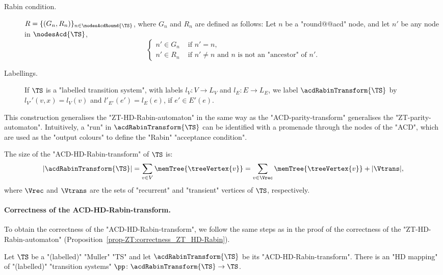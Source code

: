 \documentclass[10pt,a4paper]{amsart}
\begin{document}
\begin{definition}
\begin{description}
		\item[Rabin condition.] $R = \{(G_n, R_n)\}_{n\in \nodesAcdRound{\TS}}$, where $G_n$ and $R_n$ are defined as follows: Let $n$ be a "round@@acd" node, and let $n'$ be any node in $\nodesAcd{\TS}$,
		\begin{equation*}
			\begin{cases}
				n' \in G_n & \text{ if } n'=n,\\
				n' \in R_n & \text{ if }  n'\neq n \text{ and } n \text{ is not an "ancestor" of } n'. 
			\end{cases}
		\end{equation*} 	
		
		\item[Labellings.] If $\TS$ is a "labelled transition system", with labels $l_V\colon V \to L_V$ and $l_E\colon E \to L_E$, we label $\acdRabinTransform{\TS}$ by $l_{V'}'(v,x) = l_V(v)$ and $l'_{E'}(e') = l_E(e)$, if $e'\in E'(e)$.
	\end{description}
\end{definition}

This construction generalises the "ZT-HD-Rabin-automaton" in the same way as the "ACD-parity-transform" generalises the "ZT-parity-automaton". Intuitively, a "run" in $\acdRabinTransform{\TS}$ can be identified with a promenade through the nodes of the "ACD", which are used as the "output colours" to define the "Rabin" "acceptance condition".

\begin{remark}\label{rmk-acd:size_acd-RabinHD-transformation}
	The size of the "ACD-HD-Rabin-transform" of $\TS$ is:
	\[|\acdRabinTransform{\TS}| = \sum_{v\in V} \memTree{\treeVertex{v}} = \sum_{v\in \Vrec}\memTree{\treeVertex{v}} + |\Vtrans|,\]
	where $\Vrec$ and $\Vtrans$ are the sets of "recurrent" and "transient" vertices of $\TS$, respectively.
\end{remark}


\paragraph*{Correctness of the ACD-HD-Rabin-transform.} To obtain the correctness of the "ACD-HD-Rabin-transform", we follow the same steps as in the proof of the correctness of the "ZT-HD-Rabin-automaton" (Proposition~\ref{prop-ZT:correctness_ZT_HD-Rabin}).

\begin{proposition}\label{prop-ACD:correctness_ACD-HD-Rabin-transform}
	Let $\TS$ be a "(labelled)" "Muller" "TS" and let $\acdRabinTransform{\TS}$ be its "ACD-HD-Rabin-transform". There is an "HD mapping" of "(labelled)" "transition systems" $\pp\colon \acdRabinTransform{\TS} \to \TS$.
\end{proposition}
\end{document}
